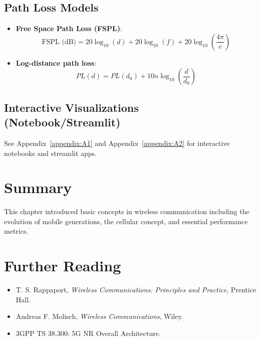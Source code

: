 \subsection{Path Loss Models}
\begin{itemize}
    \item \textbf{Free Space Path Loss (FSPL)}: 
    \[
    \text{FSPL (dB)} = 20 \log_{10}(d) + 20 \log_{10}(f) + 20 \log_{10}\left(\frac{4\pi}{c}\right)
    \]
    \item \textbf{Log-distance path loss}: 
    \[
    PL(d) = PL(d_0) + 10n \log_{10}\left(\frac{d}{d_0}\right)
    \]
\end{itemize}

\subsection{Interactive Visualizations (Notebook/Streamlit)}
See Appendix~\ref{appendix:A1} and Appendix~\ref{appendix:A2} for interactive notebooks and streamlit apps.

\section{Summary}
This chapter introduced basic concepts in wireless communication including the evolution of mobile generations, the cellular concept, and essential performance metrics.

\section{Further Reading}
\begin{itemize}
    \item T. S. Rappaport, \textit{Wireless Communications: Principles and Practice}, Prentice Hall.
    \item Andreas F. Molisch, \textit{Wireless Communications}, Wiley.
    \item 3GPP TS 38.300: 5G NR Overall Architecture.
\end{itemize}



